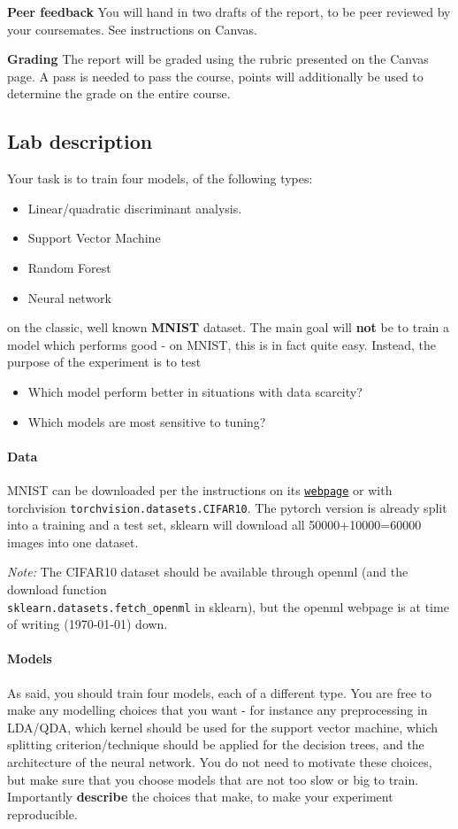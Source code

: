 \documentclass{article}
\begin{document}
\textbf{Peer feedback} You will hand in two drafts of the report, to be peer reviewed by your coursemates. See instructions on Canvas.

\textbf{Grading} The report will be graded using the rubric presented on the Canvas page. A pass is needed to pass the course, points will additionally be used to determine the grade on the entire course.

\newpage
\subsection*{Lab description}

Your task is to train four models, of the following types:
\begin{itemize}
    \item Linear/quadratic discriminant analysis.
    \item Support Vector Machine
    \item Random Forest
    \item Neural network
\end{itemize}
on the classic, well known \textbf{MNIST} dataset. The main goal will \textbf{not} be to train a model which performs good - on MNIST, this is in fact quite easy. Instead, the purpose of the experiment is to test
\begin{itemize}
    \item Which model perform better in situations with data scarcity?
    \item Which models are most sensitive to tuning?
\end{itemize}

\paragraph{Data} MNIST can be downloaded per the instructions on its \href{https://www.cs.toronto.edu/~kriz/cifar.html}{\texttt{webpage}} or with torchvision \newline \texttt{torchvision.datasets.CIFAR10}. The pytorch version is already split into a training and a test set, sklearn will download all 50000+10000=60000 images into one dataset.

\emph{Note:} The CIFAR10 dataset should be available through openml (and the download function \\\texttt{sklearn.datasets.fetch\_openml} in sklearn), but the openml webpage is at time of writing (\today) down.


\paragraph{Models} As said, you should train four models, each of a different type. You are free to make any modelling choices that you want - for instance any preprocessing in LDA/QDA, which kernel should be used for the support vector machine, which splitting criterion/technique should be applied for the decision trees, and the architecture of the neural network. You do not need to motivate these choices, but make sure that you choose models that are not too slow or big to train. Importantly \textbf{describe} the choices that  make, to make your experiment reproducible.
\end{document}
